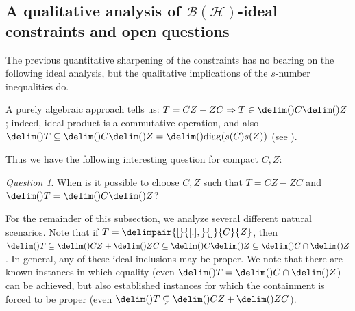 \documentclass[10pt,reqno]{amsart}
\theoremstyle{remark}
\newtheorem{question}{Question}
\newcommand{\BH}{\mathcal{B}(\Hil)}
\newcommand{\Hil}{\mathcal{H}}
\DeclareMathOperator{\diag}{diag}
\newcommand{\ideal}{\delim()}
\newcommand{\comm}{\delimpair{[}{[.],}{]}}
\numberwithin{equation}{section}
\begin{document}
\subsection*{A qualitative analysis of $\BH$-ideal constraints and open questions}

The previous quantitative sharpening of the constraints has no bearing on the following ideal analysis, but the qualitative implications of the $s$-number inequalities do.

A purely algebraic approach tells us: $T = CZ-ZC \Rightarrow T \in \ideal{C}\ideal{Z}$;
indeed, ideal product is a commutative operation, and also $\ideal{T} \subseteq \ideal{C}\ideal{Z} = \ideal{\diag (s(C)s(Z))}$ (see \cite[Section 2.8 and Theorem 6.3]{DFWW-2004-AM}).

Thus we have the following interesting question for compact $C,Z$:

\begin{question}
  When is it possible to choose $C,Z$ such that $T = CZ-ZC$ and $\ideal{T} = \ideal{C}\ideal{Z}$?
\end{question}

For the remainder of this subsection, we analyze several different natural scenarios.
Note that if $T = \comm{C}{Z}$, then $\ideal{T} \subseteq \ideal{CZ} + \ideal{ZC} \subseteq \ideal{C} \ideal{Z} \subseteq \ideal{C} \cap \ideal{Z}$.
In general, any of these ideal inclusions may be proper.
We note that there are known instances in which equality (even $\ideal{T} = \ideal{C} \cap \ideal{Z}$) can be achieved, but also established instances for which the containment is forced to be proper (even $\ideal{T} \subsetneq \ideal{CZ} + \ideal{ZC}$).
\end{document}
